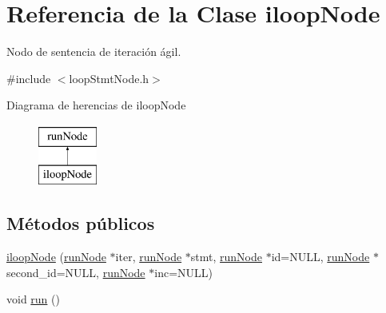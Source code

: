 \hypertarget{classiloopNode}{\section{Referencia de la Clase iloop\-Node}
\label{classiloopNode}
}


Nodo de sentencia de iteración ágil.  




{\ttfamily \#include $<$loop\-Stmt\-Node.\-h$>$}

Diagrama de herencias de iloop\-Node\begin{figure}[H]
\begin{center}
\leavevmode
\includegraphics[height=2.000000cm]{classiloopNode}
\end{center}
\end{figure}
\subsection*{Métodos públicos}
\begin{DoxyCompactItemize}
\item 
\hyperlink{classiloopNode_abf6fd3950a64b07801f4c0cd5d448b90}{iloop\-Node} (\hyperlink{classrunNode}{run\-Node} $\ast$iter, \hyperlink{classrunNode}{run\-Node} $\ast$stmt, \hyperlink{classrunNode}{run\-Node} $\ast$id=N\-U\-L\-L, \hyperlink{classrunNode}{run\-Node} $\ast$second\-\_\-id=N\-U\-L\-L, \hyperlink{classrunNode}{run\-Node} $\ast$inc=N\-U\-L\-L)
\item 
void \hyperlink{classiloopNode_af2bb6d18f46c88d2dd80db09d758fe9c}{run} ()
\end{DoxyCompactItemize}
